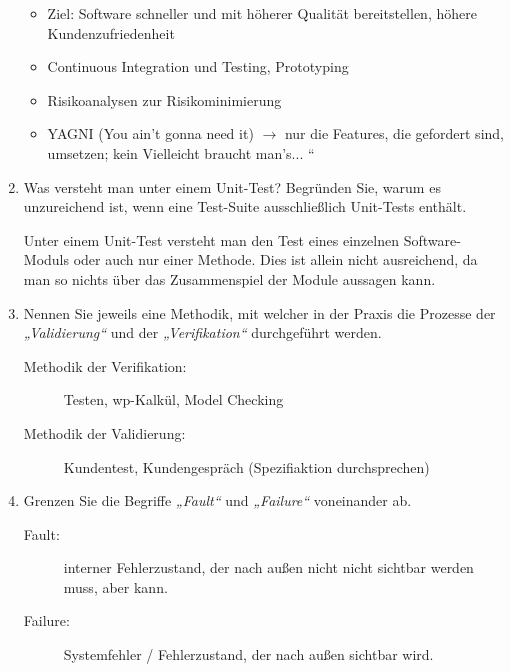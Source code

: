 \documentclass{bschlangaul-aufgabe}
\begin{document}
\begin{enumerate}
\begin{bAntwort}
\begin{itemize}
\item Ziel: Software schneller und mit höherer Qualität bereitstellen,
höhere Kundenzufriedenheit

\item Continuous Integration und Testing, Prototyping

\item Risikoanalysen zur Risikominimierung

\item YAGNI (You ain’t gonna need it) $\rightarrow$ nur die Features,
die gefordert sind, umsetzen; kein Vielleicht braucht man’s... “
\end{itemize}
\end{bAntwort}

%

\item Was versteht man unter einem Unit-Test? Begründen
Sie, warum es unzureichend ist, wenn eine Test-Suite ausschließlich
Unit-Tests enthält.

\begin{bAntwort}
Unter einem Unit-Test versteht man den Test eines einzelnen
Software-Moduls oder auch nur einer Methode. Dies ist allein nicht
ausreichend, da man so nichts über das Zusammenspiel der Module aussagen
kann.
\end{bAntwort}

%

\item Nennen Sie jeweils eine Methodik, mit welcher in der Praxis die
Prozesse der \emph{„Validierung“} und der \emph{„Verifikation“}
durchgeführt werden.

\begin{bAntwort}
\begin{description}
\item[Methodik der Verifikation:]
Testen, wp-Kalkül, Model Checking

\item[Methodik der Validierung:]
Kundentest, Kundengespräch (Spezifiaktion durchsprechen)
\end{description}
\end{bAntwort}

%

\item Grenzen Sie die Begriffe \emph{„Fault“} und \emph{„Failure“}
voneinander ab.

\begin{bAntwort}

\begin{description}
\item[Fault:]
interner Fehlerzustand, der nach außen nicht nicht sichtbar werden muss,
aber kann.

\item[Failure:]
Systemfehler / Fehlerzustand, der nach außen sichtbar wird.
\end{description}
\end{bAntwort}
\end{enumerate}
\end{document}

